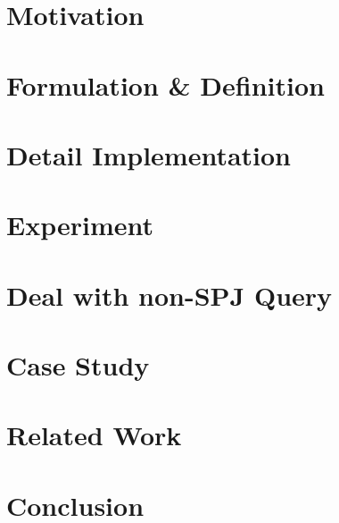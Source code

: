 \documentclass[sigconf]{acmart}
\begin{document}
\section{Motivation} \label{S2}
    

\section{Formulation \& Definition} \label{S3}
    

\section{Detail Implementation} \label{S4}
    

\section{Experiment} \label{S5}
    

\section{Deal with non-SPJ Query} \label{S6}
    

\section{Case Study} \label{S7}
    
    
\section{Related Work} \label{S8}
    

\section{Conclusion} \label{S9}
    
    



\appendix
 \label{A1}
 \label{A2}
 \label{A3}
\end{document}
